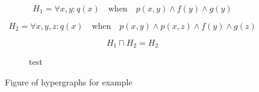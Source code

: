 \documentclass[../Master.tex]{subfiles}
\providecommand{\master}{..}
\begin{document}
\begin{example} \label{ex:ca:hgma:generalization}
    \begin{equation*}
        H_1 = \forall x, y : q(x) \quad \text{when} \quad
            p(x,y) \land f(y) \land g(y)
    \end{equation*}

    \begin{equation*}
        H_2 = \forall x, y, z : q(x) \quad \text{when} \quad
            p(x, y) \land p(x,z) \land f(y) \land g(z)
    \end{equation*}

    \begin{equation*}
        H_1 \sqcap H_2 = H_2
    \end{equation*}

    \begin{figure}
        \centering
        \begin{subfigure}[b]{0.4\textwidth}
            \centering
            \resizebox{\linewidth}{!}{}
            \caption{test}
            \label{fig:ex:ca:hgma:ex:generalization1}
        \end{subfigure}%
        \hfill%
        \begin{subfigure}[b]{0.4\textwidth}
            \centering
            \resizebox{0.8\linewidth}{!}{}
            \caption{}
            \label{fig:ex:ca:hgma:ex:generalization1}
        \end{subfigure}
        \caption{} Figure of hypergraphs for example
    \end{figure}

\end{example}
\end{document}
